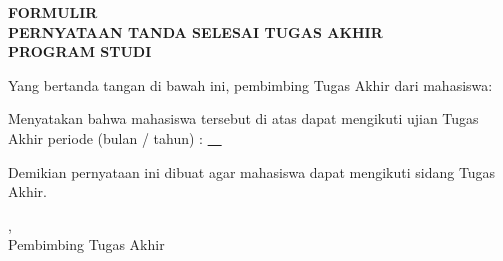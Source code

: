 \clearpage
\thispagestyle{empty}

\begin{center}
    \textbf{FORMULIR}\\[0.3em]
    \textbf{PERNYATAAN TANDA SELESAI TUGAS AKHIR}\\[0.3em]
    \textbf{PROGRAM STUDI \MakeUppercase{\prodi}}
\end{center}
\vspace{1.5em}

\noindent Yang bertanda tangan di bawah ini, pembimbing Tugas Akhir dari
mahasiswa:

\vspace{1.2em}
\vspace{1em}
\vspace{1em}

\vspace{1.5em}
\noindent Menyatakan bahwa mahasiswa tersebut di atas dapat mengikuti ujian
Tugas Akhir periode (bulan / tahun) : \underline{\ \periodeujian\ }

\vspace{1em}
\noindent Demikian pernyataan ini dibuat agar mahasiswa dapat mengikuti sidang
Tugas Akhir.

\vspace{2.5em}
\begin{flushright}
    \kotaformulir, \tglujian\\
    Pembimbing Tugas Akhir\\[3cm]
    \pembimbing
\end{flushright}
